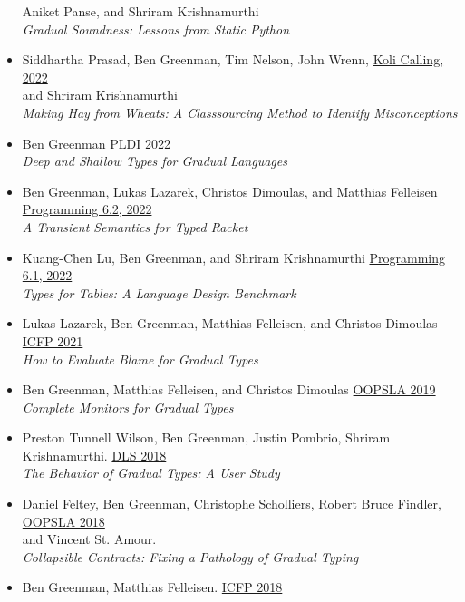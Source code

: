 \documentclass[11pt]{article}
\begin{document}
\begin{itemize}
  Aniket Panse, and Shriram Krishnamurthi \\
  \emph{Gradual Soundness: Lessons from Static Python}
\item
  Siddhartha Prasad, Ben Greenman, Tim Nelson, John Wrenn, \hfill \href{https://www.kolicalling.fi/}{Koli Calling, 2022} \\
  and Shriram Krishnamurthi \\
  \emph{Making Hay from Wheats: A Classsourcing Method to Identify Misconceptions}
\item
  Ben Greenman \hfill \href{https://pldi22.sigplan.org/}{PLDI 2022} \\
  \emph{Deep and Shallow Types for Gradual Languages}
\item
  Ben Greenman, Lukas Lazarek, Christos Dimoulas, and Matthias Felleisen \hfill \href{https://2022.programming-conference.org/}{Programming 6.2, 2022} \\
  \emph{A Transient Semantics for Typed Racket}
\item
  Kuang-Chen Lu, Ben Greenman, and Shriram Krishnamurthi \hfill \href{https://2022.programming-conference.org/}{Programming 6.1, 2022} \\
  \emph{Types for Tables: A Language Design Benchmark}
\item
  Lukas Lazarek, Ben Greenman, Matthias Felleisen, and Christos Dimoulas \hfill \href{https://icfp21.sigplan.org/}{ICFP 2021} \\
  \emph{How to Evaluate Blame for Gradual Types}
\item
  Ben Greenman, Matthias Felleisen, and Christos Dimoulas \hfill \href{https://conf.researchr.org/track/splash-2019/splash-2019-OOPSLA}{OOPSLA 2019} \\
  \emph{Complete Monitors for Gradual Types}
\item
  Preston Tunnell Wilson, Ben Greenman, Justin Pombrio, Shriram Krishnamurthi. \hfill \href{https://conf.researchr.org/track/dls-2018/dls-2018}{DLS 2018} \\
  \emph{The Behavior of Gradual Types: A User Study}
\item
  Daniel Feltey, Ben Greenman, Christophe Scholliers, Robert Bruce Findler, \hfill \href{https://2018.splashcon.org/track/splash-2018-OOPSLA}{OOPSLA 2018} \\
  and Vincent St. Amour. \\
  \emph{Collapsible Contracts: Fixing a Pathology of Gradual Typing}
\item
  Ben Greenman, Matthias Felleisen. \hfill \href{https://icfp18.sigplan.org/}{ICFP 2018} \\

\end{itemize}
\end{document}
